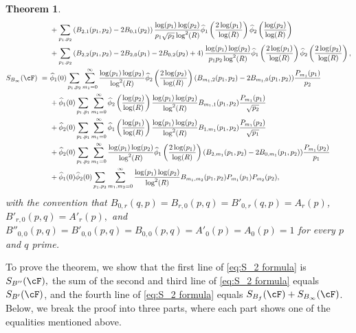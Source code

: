 \documentclass[11pt, reqno]{amsart}
\newtheorem{theorem}{Theorem}[section]
\theoremstyle{definition}
\theoremstyle{remark}
\numberwithin{equation}{section}
\renewcommand{\hat}{\widehat}
\begin{document}
\begin{theorem}
\begin{align}
    &+\sum_{p_1,p_2} \left(B_{2,1}(p_1,p_2)-2B_{0,1}(p_2)\right)\frac{\log(p_1)\log(p_2)}{p_1\sqrt{p_2}\log^2(R)} \hat\phi_1\left(\frac{2\log(p_1)}{\log(R)}\right)\hat\phi_2\left(\frac{\log(p_2)}{\log(R)}\right)\notag\\
    &+\sum_{p_1,p_2} \left(B_{2,2}(p_1,p_2)-2B_{2,0}(p_1)-2B_{0,2}(p_2)+4\right)\frac{\log(p_1)\log(p_2)}{p_1p_2\log^2(R)}\hat\phi_1\left(\frac{2\log(p_1)}{\log(R)}\right)\hat\phi_2\left(\frac{2\log(p_2)}{\log(R)}\right),\\
        S_{B_\infty}(\cF) \ = \  &\hat{\phi}_1(0)\sum_{p_1,p_2}\sum_{m_1=0}^{\infty}\frac{\log(p_1) \log(p_2)}{\log^2(R)}\hat{\phi}_2\left( \frac{2\log(p_2)}{\log(R)}\right)(B_{m_1,2}(p_1,p_2)-2B_{m_1,0}(p_1,p_2))\frac{P_{m_1}(p_1)}{p_2}\notag\\&+\hat{\phi}_1(0)\sum_{p_1,p_1}\sum_{m_1=0}^{\infty}\hat{\phi}_2\left(\frac{\log(p_2)}{\log(R)} \right)\frac{\log(p_1) \log(p_2)}{\log^2(R)}B_{m_1,1}(p_1,p_2)\frac{P_{m_1}(p_1)}{\sqrt{p_2}}\notag\\
&+\hat{\phi}_2(0)\sum_{p_1,p_1}\sum_{m_1=0}^{\infty}\hat{\phi}_1\left(\frac{\log(p_1)}{\log(R)} \right)\frac{\log(p_1) \log(p_2)}{\log^2(R)}B_{1,m_1}(p_1,p_2)\frac{P_{m_1}(p_2)}{\sqrt{p_1}}\notag\\
&+\hat{\phi}_2(0)\sum_{p_1,p_2}\sum_{m_1=0}^{\infty}\frac{\log(p_1) \log(p_2)}{\log^2(R)}\hat{\phi}_1\left( \frac{2\log(p_1)}{\log(R)}\right)(B_{2,m_1}(p_1,p_2)-2B_{0,m_1}(p_1,p_2))\frac{P_{m_1}(p_2)}{p_1} \notag\\   &+\hat{\phi}_1(0)\hat{\phi}_2(0)\sum_{p_1,p_2}\sum_{m_1,m_2=0}^\infty\frac{\log(p_1) \log(p_2)}{\log^2(R)}B_{m_1,m_2}(p_1,p_2)P_{m_1}(p_1)P_{m_2}(p_2),
    \end{align}
 \normalsize    
 with the convention that $B_{0,r}(q,p)=B_{r,0}(p,q) = B'_{0,r}(q,p)=A_r(p)$, $B'_{r,0}(p,q) = A'_r(p),$ and $B''_{0,0}(p,q)=B'_{0,0}(p,q) =B_{0,0}(p,q) =A'_{0}(p)=A_0(p) = 1 $ for every $p$ and $q$ prime.
\end{theorem}
To prove the theorem, we show that the first line of \eqref{eq:S_2 formula} is $S_{B''}(\cF),$ the sum of the second and third line of \eqref{eq:S_2 formula} equals $S_{B'}(\cF)$, and the fourth line of \eqref{eq:S_2 formula} equals $S_{B_f}(\cF) + S_{B_\infty}(\cF)$. Below, we break the proof into three parts, where each part shows one of the equalities mentioned above.
\end{document}
